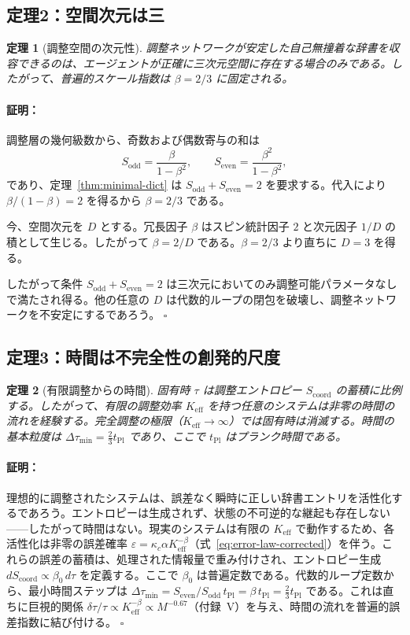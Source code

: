 \documentclass[12pt,a4paper]{article}
\newcommand{\tPl}{t_{\mathrm{Pl}}}
\newcommand{\Scoord}{S_{\mathrm{coord}}}
\newtheorem{theorem}{定理}[section]
\theoremstyle{remark}
\renewenvironment{proof}{\paragraph{証明：}}{\hfill$\square$}
\begin{document}
	\subsection{定理2：空間次元は三}
	
	\begin{theorem}[調整空間の次元性]
		\label{thm:dimension}
		調整ネットワークが安定した自己無撞着な辞書を収容できるのは、エージェントが正確に三次元空間に存在する場合のみである。したがって、普遍的スケール指数は \(\beta = 2/3\) に固定される。
	\end{theorem}
	
	\begin{proof}
		調整層の幾何級数から、奇数および偶数寄与の和は
		\[
		S_{\mathrm{odd}} = \frac{\beta}{1-\beta^2}, \qquad
		S_{\mathrm{even}} = \frac{\beta^2}{1-\beta^2},
		\]
		であり、定理~\ref{thm:minimal-dict} は \(S_{\mathrm{odd}} + S_{\mathrm{even}} = 2\) を要求する。代入により \(\beta/(1-\beta) = 2\) を得るから \(\beta = 2/3\) である。
		
		今、空間次元を \(D\) とする。冗長因子 \(\beta\) はスピン統計因子 \(2\) と次元因子 \(1/D\) の積として生じる。したがって \(\beta = 2/D\) である。\(\beta = 2/3\) より直ちに \(D = 3\) を得る。
		
		したがって条件 \(S_{\mathrm{odd}} + S_{\mathrm{even}} = 2\) は三次元においてのみ調整可能パラメータなしで満たされ得る。他の任意の \(D\) は代数的ループの閉包を破壊し、調整ネットワークを不安定にするであろう。
	\end{proof}
	
	\subsection{定理3：時間は不完全性の創発的尺度}
	
	\begin{theorem}[有限調整からの時間]
		\label{thm:time}
		固有時 \(\tau\) は調整エントロピー \(\Scoord\) の蓄積に比例する。したがって、有限の調整効率 \(K_{\mathrm{eff}}\) を持つ任意のシステムは非零の時間の流れを経験する。完全調整の極限（\(K_{\mathrm{eff}} \to \infty\)）では固有時は消滅する。時間の基本粒度は \(\Delta \tau_{\min} = \frac{2}{3} \tPl\) であり、ここで \(\tPl\) はプランク時間である。
	\end{theorem}
	
	\begin{proof}
		理想的に調整されたシステムは、誤差なく瞬時に正しい辞書エントリを活性化するであろう。エントロピーは生成されず、状態の不可逆的な継起も存在しない——したがって時間はない。現実のシステムは有限の \(K_{\mathrm{eff}}\) で動作するため、各活性化は非零の誤差確率 \(\varepsilon = \kappa_c \alpha K_{\mathrm{eff}}^{-\beta}\)（式~\ref{eq:error-law-corrected}）を伴う。これらの誤差の蓄積は、処理された情報量で重み付けされ、エントロピー生成 \(d\Scoord \propto \beta_0 \, d\tau\) を定義する。ここで \(\beta_0\) は普遍定数である。代数的ループ定数から、最小時間ステップは \(\Delta \tau_{\min} = S_{\mathrm{even}}/S_{\mathrm{odd}} \, \tPl = \beta \, \tPl = \frac{2}{3} \tPl\) である。これは直ちに巨視的関係 \(\delta\tau/\tau \propto K_{\mathrm{eff}}^{-\beta} \propto M^{-0.67}\)（付録~V）を与え、時間の流れを普遍的誤差指数に結び付ける。
	\end{proof}
	
\end{document}
